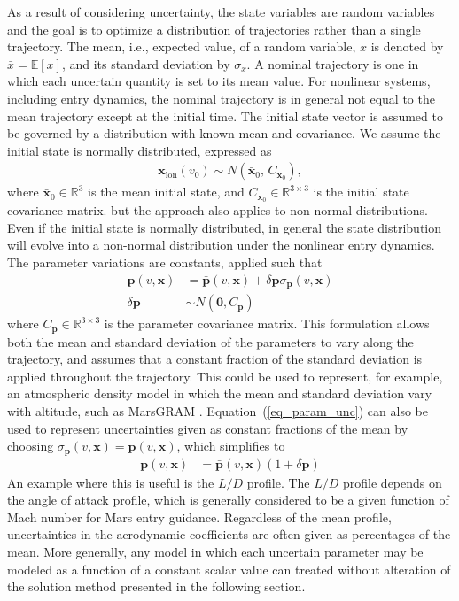 \documentclass[journal ]{new-aiaa}
\newcommand{\state}{\ensuremath{\mathbf{x}}}
\newcommand{\param}{\ensuremath{\mathbf{p}}}
\newcommand{\E}[1]{\mathbb{E}\left[#1\right]}
\newcommand{\cov}{C}
\begin{document}
As a result of considering uncertainty, the state variables are random variables and the goal is to optimize a distribution of trajectories rather than a single trajectory. The mean, i.e., expected value, of a random variable, $x$ is denoted by $\bar{x}=\E{x}$, and its standard deviation by $\sigma_{x}$. A nominal trajectory is one in which each uncertain quantity is set to its mean value. For nonlinear systems, including entry dynamics, the nominal trajectory is in general not equal to the mean trajectory except at the initial time. The initial state vector is assumed to be governed by a distribution with known mean and covariance.
We assume the initial state is normally distributed, expressed as 
\begin{align}
\state_{\mathrm{lon}}(v_0)\sim N(\bar{\state}_0,\,\cov_{\state_0})\label{eq_IC},
\end{align}
where $\bar{\state}_0\in \mathbb{R}^{3}$ is the mean initial state, and $\cov_{\state_0} \in \mathbb{R}^{3\times3}$ is the initial state covariance matrix.
but the approach also applies to non-normal distributions. Even if the initial state is normally distributed, in general the state distribution will evolve into a non-normal distribution under the nonlinear entry dynamics. The parameter variations are constants, applied such that
\begin{align}
	\param(v,\state) &= \bar{\param}(v,\state) + \delta\param\sigma_{\param}(v,\state) \label{eq_param_unc}\\
	\delta\param &\sim N(\mathbf{0},\cov_{\param})
\end{align}
where $\cov_{\param}\in \mathbb{R}^{3\times3}$ is the parameter covariance matrix.
This formulation allows both the mean and standard deviation of the parameters to vary along the trajectory, and assumes that a constant fraction of the standard deviation is applied throughout the trajectory. This could be used to represent, for example, an atmospheric density model in which the mean and standard deviation vary with altitude, such as MarsGRAM \cite{MarsGRAM2010}.
Equation~(\ref{eq_param_unc}) can also be used to represent uncertainties given as constant fractions of the mean by choosing $\sigma_{\param}(v,\state) = \bar{\param}(v,\state)$, which simplifies to
\begin{align}
		\param(v,\state) &= \bar{\param}(v,\state)(1 + \delta\param)
\end{align}
An example where this is useful is the $L/D$ profile. The $L/D$ profile depends on the angle of attack profile, which is generally considered to be a given function of Mach number for Mars entry guidance. Regardless of the mean profile, uncertainties in the aerodynamic coefficients are often given as percentages of the mean. More generally, any model in which each uncertain parameter may be modeled as a function of a constant scalar value can treated without alteration of the solution method presented in the following section. 
\end{document}
